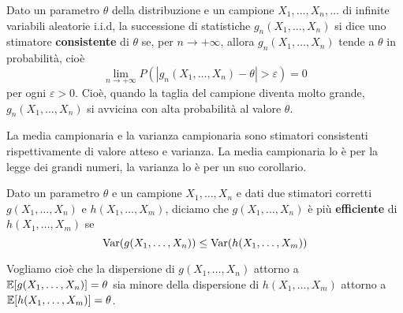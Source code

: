 \begin{definition}
	Dato un parametro $\theta$ della distribuzione e un campione $X_1, \dots, X_n, \dots$ di
	infinite variabili aleatorie i.i.d, la successione di statistiche $g_n(X_1, \dots, X_n)$ si
	dice uno stimatore \textbf{consistente} di $\theta$ se, per $n \to +\infty$, allora
	$g_n(X_1, \dots, X_n)$ tende a $\theta$ in probabilità, cioè
	\[ \lim_{n \to +\infty} P(|g_n(X_1, \dots, X_n) - \theta| > \varepsilon) = 0 \]
	per ogni $\varepsilon > 0$. Cioè, quando la taglia del campione diventa molto grande,
	$g_n(X_1, \dots, X_n)$ si avvicina con alta probabilità al valore $\theta$.
\end{definition}

La media campionaria e la varianza campionaria sono stimatori consistenti rispettivamente di valore
atteso e varianza. La media campionaria lo è per la legge dei grandi numeri, la varianza lo è per
un suo corollario.

\begin{definition}
	Dato un parametro $\theta$ e un campione $X_1, \dots, X_n$ e dati due stimatori corretti
	$g(X_1, \dots, X_n)$ e $h(X_1, \dots, X_m)$, diciamo che $g(X_1, \dots, X_n)$ è più
	\textbf{efficiente} di $h(X_1, \dots, X_m)$ se
	\[ \operatorname{Var}(g(X_1, \dots, X_n)) \leq \operatorname{Var}(h(X_1, \dots, X_m)) \]
\end{definition}

Vogliamo cioè che la dispersione di $g(X_1, \dots, X_n)$ attorno a
$\mathbb{E}[g(X_1, \dots, X_n)] = \theta$ sia minore della dispersione di $h(X_1, \dots, X_m)$ attorno a
$\mathbb{E}[h(X_1, \dots, X_m)] = \theta$.